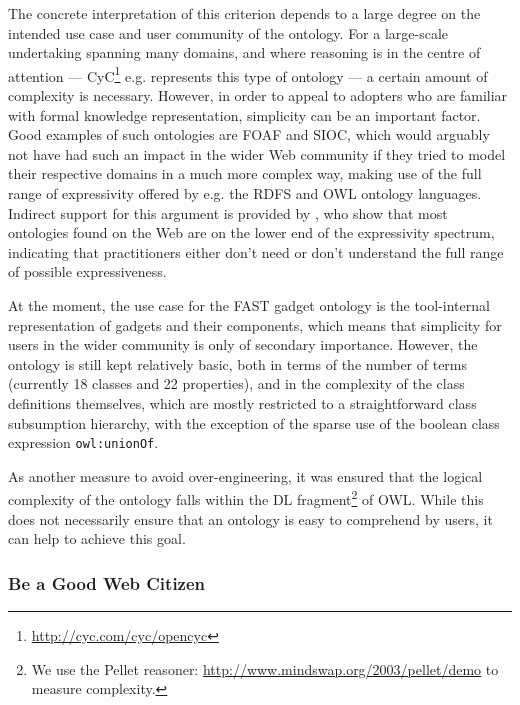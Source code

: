 \documentclass{article}
\begin{document}
The concrete interpretation of this criterion depends to a large degree on the intended use case and user community of the ontology. For a large-scale undertaking spanning many domains, and where reasoning is in the centre of attention --- CyC\footnote{\url{http://cyc.com/cyc/opencyc}} e.g. represents this type of ontology  --- a certain amount of complexity is necessary. However, in order to appeal to adopters who are familiar with formal knowledge representation, simplicity can be an important factor. Good examples of such ontologies are FOAF and SIOC, which would arguably not have had such an impact in the wider Web community if they tried to model their respective domains in a much more complex way, making use of the full range of expressivity offered by e.g. the RDFS and OWL ontology languages. Indirect support for this argument is provided by \cite{wang2006owl_survey}, who show that most ontologies found on the Web are on the lower end of the expressivity spectrum, indicating that practitioners either don't need or don't understand the full range of possible expressiveness.

At the moment, the use case for the FAST gadget ontology is the tool-internal representation of gadgets and their components, which means that simplicity for users in the wider community is only of secondary importance. However, the ontology is still kept relatively basic, both in terms of the number of terms (currently 18 classes and 22 properties), and in the complexity of the class definitions themselves, which are mostly restricted to a straightforward class subsumption hierarchy, with the exception of the sparse use of the boolean class expression \texttt{owl:unionOf}.

As another measure to avoid over-engineering, it was ensured that the logical complexity of the ontology falls within the DL fragment\footnote{We use the Pellet reasoner: \url{http://www.mindswap.org/2003/pellet/demo} to measure complexity.} of OWL. While this does not necessarily ensure that an ontology is easy to comprehend by users, it can help to achieve this goal.


\subsubsection{Be a Good Web Citizen} %
\label{ssub:be_a_good_web_citizen}
\end{document}
